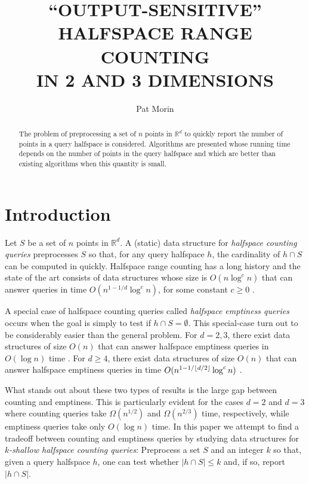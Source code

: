 \documentclass[lotsofwhite]{patmorin}
\title{\MakeUppercase{``Output-Sensitive'' Halfspace Range Counting}
           \\ \MakeUppercase{in 2 and 3 Dimensions}}
\author{Pat Morin}
\date{}
\begin{document}
\maketitle
\begin{abstract}
The problem of preprocessing a set of $n$ points in $\mathbb{R}^d$
to quickly report the number of points
in a query halfspace is considered.
Algorithms are presented whose running time depends on the number of
points in the query halfspace and which are better than
existing algorithms when this quantity is small.  
\end{abstract}

\section{Introduction}

Let $S$ be a set of $n$ points in $\mathbb{R}^d$.  A (static) data
structure for \emph{halfspace counting queries} preprocesses $S$ so
that, for any query halfspace $h$, the cardinality of $h\cap S$ can be
computed in quickly. Halfspace range counting has a long history
\cite{aeXX} and the state of the art consists of data structures whose
size is $O(n\log^c n)$ that can answer queries in time
$O(n^{1-1/d}\log^c n)$, for some constant $c\ge 0$ \cite{X}.  

A special case of halfspace counting queries called \emph{halfspace
emptiness queries} occurs when the goal is simply to test if $h\cap
S=\emptyset$.  This special-case turn out to be considerably easier
than the general problem.  For $d=2,3$, there exist data structures of
size $O(n)$ that can answer halfspace emptiness queries in $O(\log n)$
time \cite{preparata-shamos,dobkin-kirkpatrick,dhks}. For $d\ge 4$,
there exist data structures of size $O(n)$ that can answer halfspace
emptiness queries in time $O(n^{1-1/\left\lfloor d/2 \right\rfloor}\log^c n)$
\cite{matousek-shallow}.

What stands out about these two types of results is the large gap
between counting and emptiness.  This is particularly evident for the
cases $d=2$ and $d=3$ where counting queries take $\Omega(n^{1/2})$
and $\Omega(n^{2/3})$ time, respectively, while emptiness queries take
only $O(\log n)$ time.  In this paper we attempt to find a tradeoff
between counting and emptiness queries by studying data structures for
\emph{$k$-shallow halfspace counting queries}:  Preprocess a set $S$
and an integer $k$ so that, given a query halfspace $h$, one can test
whether $|h\cap S|\le k$ and, if so, report $|h\cap S|$. 
 
\end{document}
